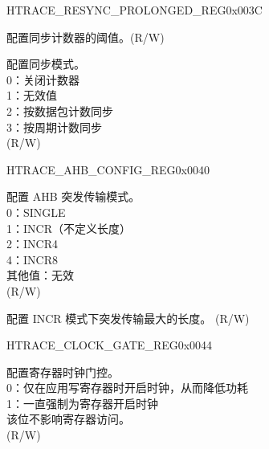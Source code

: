 \begin{register}{H}{TRACE\_RESYNC\_PROLONGED\_REG}{0x003C}\label{regdesc:TRACERESYNCPROLONGEDREG}
%
%
%
\regnewline%
\begin{regdesc}\begin{reglist}
\label{fielddesc:TRACERESYNCPROLONGED}\item [TRACE\_RESYNC\_PROLONGED] 配置同步计数器的阈值。(R/W)
\label{fielddesc:TRACERESYNCMODE}\item [TRACE\_RESYNC\_MODE] 配置同步模式。\\
0：关闭计数器\\
1：无效值\\
2：按数据包计数同步\\
3：按周期计数同步\\ (R/W)
\end{reglist}\end{regdesc}
\end{register}


\begin{register}{H}{TRACE\_AHB\_CONFIG\_REG}{0x0040}\label{regdesc:TRACEAHBCONFIGREG}
%
%
%
\regnewline%
\begin{regdesc}\begin{reglist}
\label{fielddesc:TRACEHBURST}\item [TRACE\_HBURST] 配置 AHB 突发传输模式。\\
0：SINGLE\\
1：INCR（不定义长度）\\
2：INCR4\\
4：INCR8\\
其他值：无效\\ (R/W)
\label{fielddesc:TRACEMAXINCR}\item [TRACE\_MAX\_INCR] 配置 INCR 模式下突发传输最大的长度。 (R/W)
\end{reglist}\end{regdesc}
\end{register}


\begin{register}{H}{TRACE\_CLOCK\_GATE\_REG}{0x0044}\label{regdesc:TRACECLOCKGATEREG}
%
%
\regnewline%
\begin{regdesc}\begin{reglist}
\label{fielddesc:TRACECLKEN}\item [TRACE\_CLK\_EN] 配置寄存器时钟门控。\\
0：仅在应用写寄存器时开启时钟，从而降低功耗\\
1：一直强制为寄存器开启时钟\\
该位不影响寄存器访问。\\ (R/W)
\end{reglist}\end{regdesc}
\end{register}


